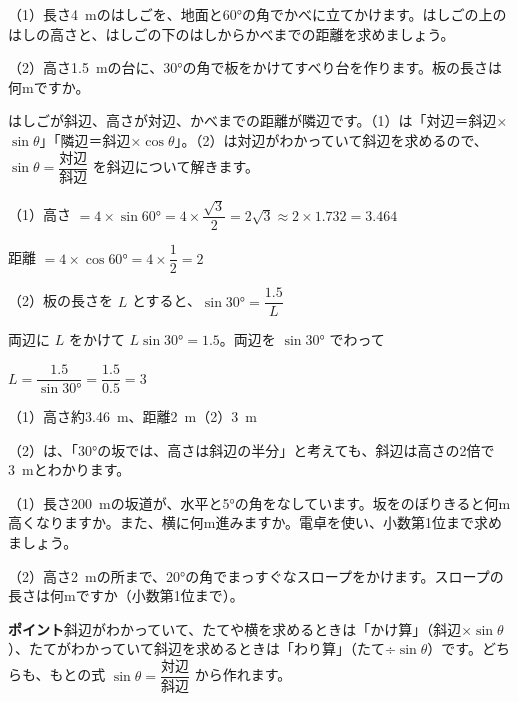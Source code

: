 \begin{reidai}
（1）長さ\qty{4}{m}のはしごを、地面と\ang{60}の角でかべに立てかけます。はしごの上のはしの高さと、はしごの下のはしからかべまでの距離を求めましょう。\par
（2）高さ\qty{1.5}{m}の台に、\ang{30}の角で板をかけてすべり台を作ります。板の長さは何mですか。\par
\kangaekata はしごが斜辺、高さが対辺、かべまでの距離が隣辺です。（1）は「対辺＝斜辺×$\sin\theta$」「隣辺＝斜辺×$\cos\theta$」。（2）は対辺がわかっていて斜辺を求めるので、$\sin\theta=\dfrac{\text{対辺}}{\text{斜辺}}$ を斜辺について解きます。\par
\shiki（1）高さ $=4\times\sin\ang{60}=4\times\dfrac{\sqrt3}{2}=2\sqrt3\approx2\times1.732=3.464$\par
\hspace*{4.6\zw}距離 $=4\times\cos\ang{60}=4\times\dfrac{1}{2}=2$\par
\hspace*{2.6\zw}（2）板の長さを $L$ とすると、$\sin\ang{30}=\dfrac{1.5}{L}$\par
\hspace*{4.6\zw}両辺に $L$ をかけて $L\sin\ang{30}=1.5$。両辺を $\sin\ang{30}$ でわって\par
\hspace*{4.6\zw}$L=\dfrac{1.5}{\sin\ang{30}}=\dfrac{1.5}{0.5}=3$\par
\kotae （1）高さ約\qty{3.46}{m}、距離\qty{2}{m}\quad（2）\qty{3}{m}
\end{reidai}
（2）は、「\ang{30}の坂では、高さは斜辺の半分」と考えても、斜辺は高さの2倍で\qty{3}{m}とわかります。

\begin{jibun}
（1）長さ\qty{200}{m}の坂道が、水平と\ang{5}の角をなしています。坂をのぼりきると何m高くなりますか。また、横に何m進みますか。電卓を使い、小数第1位まで求めましょう。\par
（2）高さ\qty{2}{m}の所まで、\ang{20}の角でまっすぐなスロープをかけます。スロープの長さは何mですか（小数第1位まで）。
\end{jibun}
\textbf{ポイント}\quad 斜辺がわかっていて、たてや横を求めるときは「かけ算」（斜辺×$\sin\theta$）、たてがわかっていて斜辺を求めるときは「わり算」（たて÷$\sin\theta$）です。どちらも、もとの式 $\sin\theta=\dfrac{\text{対辺}}{\text{斜辺}}$ から作れます。

